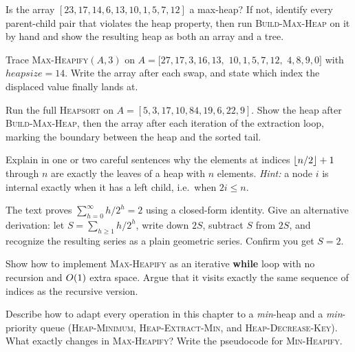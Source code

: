 \begin{exercise}
Is the array $[23, 17, 14, 6, 13, 10, 1, 5, 7, 12]$ a max-heap? If not, identify
every parent-child pair that violates the heap property, then run
\textsc{Build-Max-Heap} on it by hand and show the resulting heap as both an array
and a tree.
\end{exercise}

\begin{exercise}
Trace \textsc{Max-Heapify}$(A, 3)$ on
$A = [27, 17, 3, 16, 13,$ $10, 1, 5, 7, 12,$ $4, 8, 9, 0]$ with $\mathit{heapsize} =
14$. Write the array after each swap, and state which index the displaced value
finally lands at.
\end{exercise}

\begin{exercise}
Run the full \textsc{Heapsort} on $A = [5, 3, 17, 10, 84, 19, 6, 22, 9]$. Show
the heap after \textsc{Build-Max-Heap}, then the array after each iteration of the
extraction loop, marking the boundary between the heap and the sorted tail.
\end{exercise}

\begin{exercise}
Explain in one or two careful sentences why the elements at indices
$\lfloor n/2\rfloor+1$ through $n$ are exactly the leaves of a heap with $n$ elements.
\emph{Hint:} a node $i$ is internal exactly when it has a left child, i.e.\ when
$2i \le n$.
\end{exercise}

\begin{exercise}
The text proves $\sum_{h=0}^{\infty} h/2^{h} = 2$ using a closed-form identity.
Give an alternative derivation: let $S = \sum_{h\ge 1} h/2^{h}$, write down
$2S$, subtract $S$ from $2S$, and recognize the resulting series as a plain
geometric series. Confirm you get $S = 2$.
\end{exercise}

\begin{exercise}
Show how to implement \textsc{Max-Heapify} as an iterative \textbf{while} loop
with no recursion and $O(1)$ extra space. Argue that it visits exactly the same
sequence of indices as the recursive version.
\end{exercise}

\begin{exercise}
Describe how to adapt every operation in this chapter to a \emph{min}-heap and
a \emph{min}-priority queue (\textsc{Heap-Minimum}, \textsc{Heap-Extract-Min}, and
\textsc{Heap-Decrease-Key}). What exactly changes in \textsc{Max-Heapify}? Write
the pseudocode for \textsc{Min-Heapify}.
\end{exercise}


